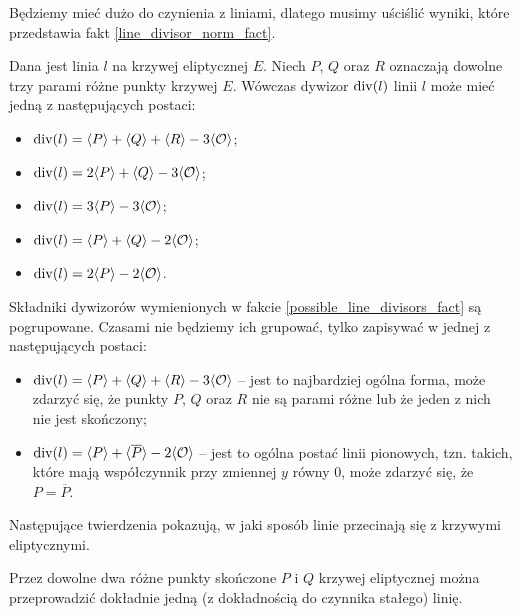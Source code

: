 Będziemy mieć dużo do czynienia z liniami,
dlatego musimy uściślić wyniki,
które przedstawia fakt \ref{line_divisor_norm_fact}.

\begin{fact}\label{possible_line_divisors_fact}
Dana jest linia $l$ na krzywej eliptycznej $E$.
Niech $P$, $Q$ oraz $R$ oznaczają dowolne trzy parami różne punkty krzywej $E$.
Wówczas dywizor $\operatorname{div}(l)$ linii $l$ może mieć jedną z następujących postaci:
\begin{itemize}
\item $\operatorname{div}(l) = \langle P\rangle + \langle Q\rangle + \langle R\rangle - 3\langle\mathcal{O}\rangle$;
\item $\operatorname{div}(l) = 2\langle P\rangle + \langle Q\rangle - 3\langle\mathcal{O}\rangle$;
\item $\operatorname{div}(l) = 3\langle P\rangle - 3\langle\mathcal{O}\rangle$;
\item $\operatorname{div}(l) = \langle P\rangle + \langle Q\rangle - 2\langle\mathcal{O}\rangle$;
\item $\operatorname{div}(l) = 2\langle P\rangle - 2\langle\mathcal{O}\rangle$.
\end{itemize}
\end{fact}

\begin{remark}\label{possible_line_divisors_remark}
Składniki dywizorów wymienionych w fakcie \ref{possible_line_divisors_fact}
są pogrupowane. Czasami nie będziemy ich grupować,
tylko zapisywać w jednej z następujących postaci:
\begin{itemize}
\item $\operatorname{div}(l) = \langle P\rangle + \langle Q\rangle + \langle R\rangle - 3\langle\mathcal{O}\rangle$ --
jest to najbardziej ogólna forma,
może zdarzyć się, że punkty $P$, $Q$ oraz $R$ nie są parami różne
lub że jeden z nich nie jest skończony;
\item $\operatorname{div}(l) = \langle P\rangle + \langle\overline{P}\rangle - 2\langle\mathcal{O}\rangle$ --
jest to ogólna postać linii pionowych,
tzn. takich, które mają współczynnik przy zmiennej $y$ równy $0$,
może zdarzyć się, że $P = \overline{P}$.
\end{itemize}
\end{remark}

Następujące twierdzenia pokazują,
w jaki sposób linie przecinają się z krzywymi eliptycznymi.

\begin{theorem}\label{line_through_two_points_theorem}
Przez dowolne dwa różne punkty skończone $P$ i $Q$ krzywej eliptycznej
można przeprowadzić dokładnie jedną (z dokładnością do czynnika stałego) linię.
\end{theorem}

